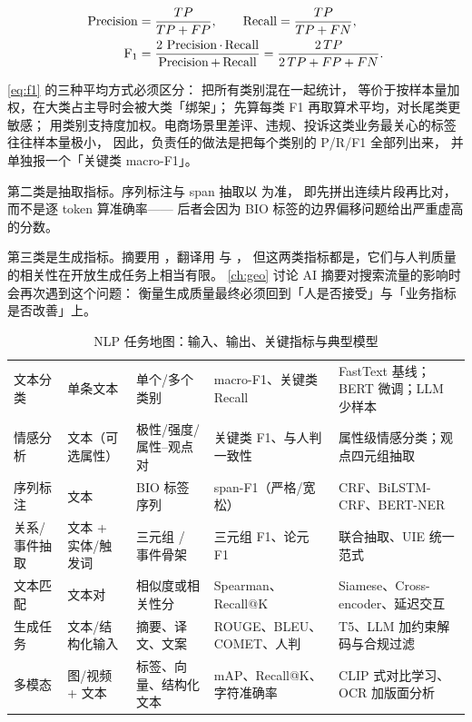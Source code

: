 \begin{equation}
\begin{aligned}
\operatorname{Precision} &= \frac{TP}{TP + FP}, \qquad
\operatorname{Recall} = \frac{TP}{TP + FN}, \\
\operatorname{F_1} &= \frac{2\,\operatorname{Precision} \cdot \operatorname{Recall}}{\operatorname{Precision} + \operatorname{Recall}}
= \frac{2\,TP}{2\,TP + FP + FN}.
\end{aligned}
\label{eq:f1}
\end{equation}

\cref{eq:f1} 的三种平均方式必须区分： 把所有类别混在一起统计，
等价于按样本量加权，在大类占主导时会被大类「绑架」；
 先算每类 F1 再取算术平均，对长尾类更敏感；
 用类别支持度加权。电商场景里差评、违规、投诉这类业务最关心的标签往往样本量极小，
因此，负责任的做法是把每个类别的 P/R/F1 全部列出来，
并单独报一个「关键类 macro-F1」。

第二类是抽取指标。序列标注与 span 抽取以  为准，
即先拼出连续片段再比对，而不是逐 token 算准确率——
后者会因为 BIO 标签的边界偏移问题给出严重虚高的分数。

第三类是生成指标。摘要用 ，翻译用  与 ，
但这两类指标都是，它们与人判质量的相关性在开放生成任务上相当有限。
\cref{ch:geo} 讨论 AI 摘要对搜索流量的影响时会再次遇到这个问题：
衡量生成质量最终必须回到「人是否接受」与「业务指标是否改善」上。

\begin{table}[htbp]
\centering
\caption{NLP 任务地图：输入、输出、关键指标与典型模型}
\label{tab:nlp-task-map}
\small
\begin{tabularx}{\textwidth}{L{2.0cm} L{2.5cm} L{2.6cm} L{2.2cm} Y}
\toprule
{} &  &  &  &  \\
\midrule
文本分类 & 单条文本 & 单个/多个类别 & macro-F1、关键类 Recall & FastText 基线；BERT 微调；LLM 少样本 \\
\addlinespace
情感分析 & 文本（可选属性） & 极性/强度/属性--观点对 & 关键类 F1、与人判一致性 & 属性级情感分类；观点四元组抽取 \\
\addlinespace
序列标注 & 文本 & BIO 标签序列 & span-F1（严格/宽松） & CRF、BiLSTM-CRF、BERT-NER \\
\addlinespace
关系/事件抽取 & 文本 + 实体/触发词 & 三元组 / 事件骨架 & 三元组 F1、论元 F1 & 联合抽取、UIE 统一范式 \\
\addlinespace
文本匹配 & 文本对 & 相似度或相关性分 & Spearman、Recall@K & Siamese、Cross-encoder、延迟交互 \\
\addlinespace
生成任务 & 文本/结构化输入 & 摘要、译文、文案 & ROUGE、BLEU、COMET、人判 & T5、LLM 加约束解码与合规过滤 \\
\addlinespace
多模态 & 图/视频 + 文本 & 标签、向量、结构化文本 & mAP、Recall@K、字符准确率 & CLIP 式对比学习、OCR 加版面分析 \\
\bottomrule
\end{tabularx}
\end{table}

